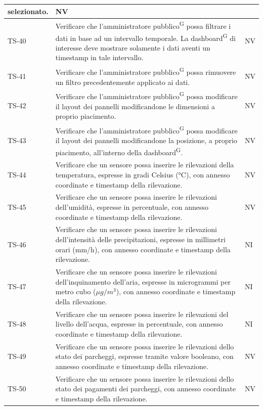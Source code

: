 \documentclass[8pt]{article}
\newcommand{\glossterm}[1]{#1\textsuperscript{G}} %
\begin{document}
\begin{longtable}{|>{\centering}p{2cm}|>{\RaggedRight}m{12cm}|>{\centering\arraybackslash}p{2cm}|}
    selezionato. & NV \\
    \hline
    TS-40 & Verificare che l’\glossterm{amministratore pubblico} possa filtrare i dati in base ad un intervallo temporale. La \glossterm{dashboard} di interesse deve mostrare solamente i dati aventi un timestamp in tale intervallo.
    & NV\\
    \hline
    TS-41 & Verificare che l’\glossterm{amministratore pubblico} possa rimuovere un filtro precedentemente applicato ai dati.
    & NV\\
    \hline
    TS-42 & Verificare che l’\glossterm{amministratore pubblico} possa modificare il layout dei pannelli modificandone le dimensioni a proprio piacimento.
    & NV\\
    \hline
    TS-43 & Verificare che l’\glossterm{amministratore pubblico} possa modificare il layout dei pannelli modificandone la posizione, a proprio piacimento, all'interno della \glossterm{dashboard}.
    & NV\\
    \hline
    TS-44 & Verificare che un sensore possa inserire le rilevazioni della temperatura, espresse in
    gradi Celsius (°C), con annesso coordinate e timestamp della rilevazione. & NV \\
    \hline
    TS-45 & Verificare che un sensore possa inserire le rilevazioni dell'umidità, espresse in
    percentuale, con annesso coordinate e timestamp della rilevazione. & NV \\
    \hline
    TS-46 & Verificare che un sensore possa inserire le rilevazioni dell'intensità delle precipitazioni, espresse in
    millimetri orari (mm/h), con annesso coordinate e timestamp della rilevazione. & NI \\
    \hline
    TS-47 & Verificare che un sensore possa inserire le rilevazioni dell'inquinamento dell'aria, espresse in
    microgrammi per metro cubo ($\mu g/m^3$), con annesso coordinate e timestamp della rilevazione. & NI \\
    \hline
    TS-48 & Verificare che un sensore possa inserire le rilevazioni del livello dell'acqua, espresse in
    percentuale, con annesso coordinate e timestamp della rilevazione. & NI \\
    \hline
    TS-49 & Verificare che un sensore possa inserire le rilevazioni dello stato dei parcheggi,
    espresse tramite valore booleano, con annesso coordinate e timestamp della rilevazione. & NV \\
    \hline 
    TS-50 & Verificare che un sensore possa inserire le rilevazioni dello stato dei pagamenti
    dei parcheggi, con annesso coordinate e timestamp della rilevazione. & NV \\

\end{longtable}
\end{document}
